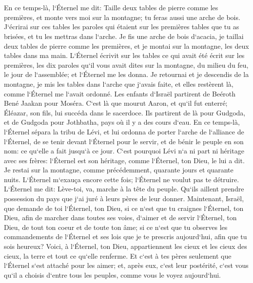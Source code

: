 \chapter{}

\verse En ce temps-là, l`Éternel me dit: Taille deux tables de pierre comme les premières, et monte vers moi sur la montagne; tu feras aussi une arche de bois. 
\verse J`écrirai sur ces tables les paroles qui étaient sur les premières tables que tu as brisées, et tu les mettras dans l`arche. 
\verse Je fis une arche de bois d`acacia, je taillai deux tables de pierre comme les premières, et je montai sur la montagne, les deux tables dans ma main. 
\verse L`Éternel écrivit sur les tables ce qui avait été écrit sur les premières, les dix paroles qu`il vous avait dites sur la montagne, du milieu du feu, le jour de l`assemblée; et l`Éternel me les donna. 
\verse Je retournai et je descendis de la montagne, je mis les tables dans l`arche que j`avais faite, et elles restèrent là, comme l`Éternel me l`avait ordonné. 
\verse Les enfants d`Israël partirent de Beéroth Bené Jaakan pour Moséra. C`est là que mourut Aaron, et qu`il fut enterré; Éléazar, son fils, lui succéda dans le sacerdoce. 
\verse Ils partirent de là pour Gudgoda, et de Gudgoda pour Jothbatha, pays où il y a des cours d`eau. 
\verse En ce temps-là, l`Éternel sépara la tribu de Lévi, et lui ordonna de porter l`arche de l`alliance de l`Éternel, de se tenir devant l`Éternel pour le servir, et de bénir le peuple en son nom: ce qu`elle a fait jusqu`à ce jour. 
\verse C`est pourquoi Lévi n`a ni part ni héritage avec ses frères: l`Éternel est son héritage, comme l`Éternel, ton Dieu, le lui a dit. 
\verse Je restai sur la montagne, comme précédemment, quarante jours et quarante nuits. L`Éternel m`exauça encore cette fois; l`Éternel ne voulut pas te détruire. 
\verse L`Éternel me dit: Lève-toi, va, marche à la tête du peuple. Qu`ils aillent prendre possession du pays que j`ai juré à leurs pères de leur donner. 
\verse Maintenant, Israël, que demande de toi l`Éternel, ton Dieu, si ce n`est que tu craignes l`Éternel, ton Dieu, afin de marcher dans toutes ses voies, d`aimer et de servir l`Éternel, ton Dieu, de tout ton coeur et de toute ton âme; 
\verse si ce n`est que tu observes les commandements de l`Éternel et ses lois que je te prescris aujourd`hui, afin que tu sois heureux? 
\verse Voici, à l`Éternel, ton Dieu, appartiennent les cieux et les cieux des cieux, la terre et tout ce qu`elle renferme. 
\verse Et c`est à tes pères seulement que l`Éternel s`est attaché pour les aimer; et, après eux, c`est leur postérité, c`est vous qu`il a choisis d`entre tous les peuples, comme vous le voyez aujourd`hui. 
